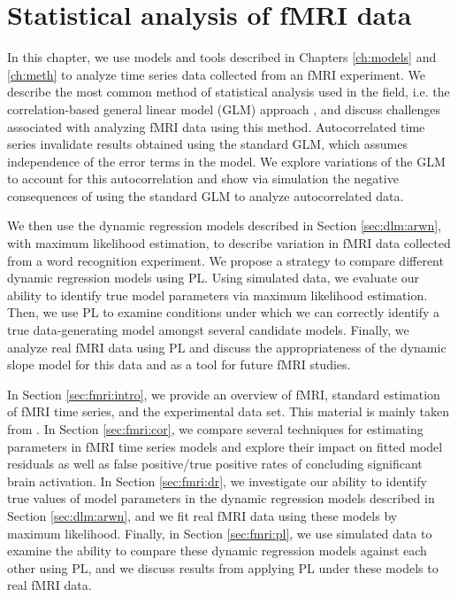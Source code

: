 \chapter{Statistical analysis of fMRI data \label{ch:fmri}}

In this chapter, we use models and tools described in Chapters \ref{ch:models} and \ref{ch:meth} to analyze time series data collected from an fMRI experiment. We describe the most common method of statistical analysis used in the field, i.e. the correlation-based general linear model (GLM) approach \citep{friston:frith:JCBFM:1991,friston:holmes:hbm:1995}, and discuss challenges associated with analyzing fMRI data using this method. Autocorrelated time series invalidate results obtained using the standard GLM, which assumes independence of the error terms in the model. We explore variations of the GLM to account for this autocorrelation and show via simulation the negative consequences of using the standard GLM to analyze autocorrelated data.

We then use the dynamic regression models described in Section \ref{sec:dlm:arwn}, with maximum likelihood
estimation, to describe variation in fMRI data collected from a word recognition experiment. We propose a strategy to compare
different dynamic regression models using PL. Using simulated data, we evaluate our ability to identify true model parameters via maximum likelihood estimation. Then, we use PL to examine conditions under which we can correctly identify a true data-generating model amongst several candidate models. Finally, we analyze real fMRI data using PL and discuss the appropriateness of the dynamic slope model for this data and as a tool for future fMRI studies.

In Section \ref{sec:fmri:intro}, we provide an overview of fMRI, standard estimation of fMRI time series, and the experimental data set. This material is mainly taken from \citet{ashby:fmri:2011}. In Section \ref{sec:fmri:cor}, we compare several techniques for estimating parameters in fMRI time series models and explore their impact on fitted model residuals as well as false positive/true positive rates of concluding significant brain activation. In Section \ref{sec:fmri:dr}, we investigate our ability to identify true values of model parameters in the dynamic regression models described in Section \ref{sec:dlm:arwn}, and we fit real fMRI data using these models by maximum likelihood. Finally, in Section \ref{sec:fmri:pl}, we use simulated data to examine the ability to compare these dynamic regression models against each other using PL, and we discuss results from applying PL under these models to real fMRI data.

